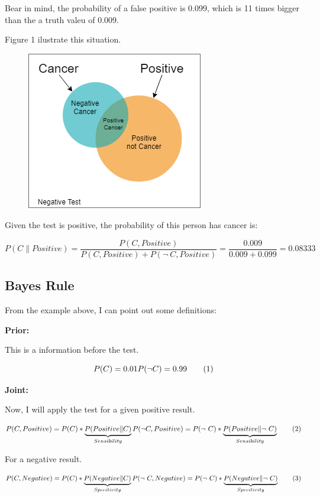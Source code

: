 \documentclass[]{book}
\begin{document}
Bear in mind, the probability of a false positive is 0.099, which is 11
times bigger than the a truth valeu of 0.009.

Figure 1 ilustrate this situation.

\begin{figure}
\centering
\includegraphics{01-img/c4_l7_01.png}
\caption{}
\end{figure}

Given the test is positive, the probability of this person has cancer
is:

\[ P(C\|Positive) = \frac{P(C,Positive)}{P(C,Positive) + P(\neg \ C,Positive)} = \frac{0.009}{0.009 + 0.099} = 0.08333\]

\subsection{Bayes Rule}\label{bayes-rule}

From the example above, I can point out some definitions:

\textbf{Prior:}

This is a information before the test.

\[ P(C) = 0.01 \\ P(\neg C) = 0.99 \tag{1}\]

\textbf{Joint:}

Now, I will apply the test for a given positive result.

\[ P(C,Positive) = P(C) * \underbrace{P(Positive\|C)}_{Sensibility} \\
   P(\neg C,Positive) = P(\neg \ C) * \underbrace{P(Positive\| \neg \ C)}_{Sensibility} \tag{2} \]

For a negative result.

\[ P(C,Negative) = P(C) * \underbrace{P(Negative\|C)}_{Specitivity} \\
      P(\neg \ C,Negative) = P(\neg \ C) * \underbrace{P(Negative\| \neg \ C)}_{Specitivity} \tag{3}\]
\end{document}
